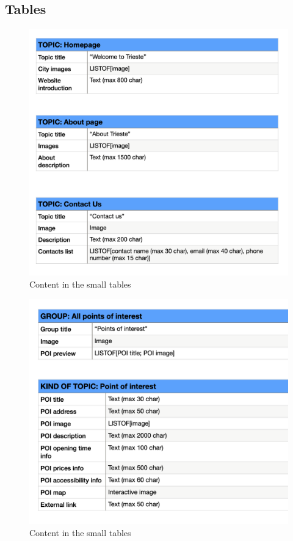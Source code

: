 \documentclass[table, 12pt]{article}
\begin{document}
\subsection{Tables}
\begin{figure}[H]
    \begin{center}
        \includegraphics[width=\textwidth]{assets/Tables/Small/contentSmall1.png}
        \caption{Content in the small tables}
    \end{center}
\end{figure}

\begin{figure}[H]
    \begin{center}
        \includegraphics[width=\textwidth]{assets/Tables/Small/contentSmall2.png}
        \caption{Content in the small tables}
    \end{center}
\end{figure}
\end{document}
